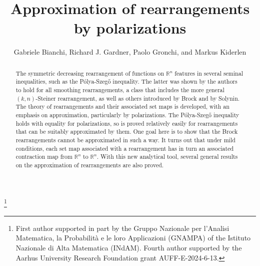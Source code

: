 \documentclass[12pt,reqno]{amsart}
\newcommand{\R}{{\mathbb R}}
\numberwithin{equation}{section}
\begin{document}
\bigskip

\title{Approximation of rearrangements by polarizations}
\author[Gabriele Bianchi, Richard J. Gardner, Paolo Gronchi, and Markus Kiderlen]{Gabriele Bianchi, Richard J. Gardner, Paolo Gronchi, and Markus Kiderlen}
\address{Dipartimento di Matematica e Informatica ``U. Dini", Universit\`a di Firenze, Viale Morgagni 67/A, Firenze, Italy I-50134} 
\address{Department of Mathematics, Western Washington University,
Bellingham, WA 98225-9063,USA} 
\address{Department of Mathematical Sciences, University of Aarhus,
Ny Munkegade, DK--8000 Aarhus C, Denmark} 
\thanks{First author supported in part by the Gruppo
Nazionale per l'Analisi Matematica, la Probabilit\`a e le loro
Applicazioni (GNAMPA) of the Istituto Nazionale di Alta Matematica (INdAM). Fourth author supported by the Aarhus University Research Foundation grant AUFF-E-2024-6-13.}
 


\begin{abstract}
The symmetric decreasing rearrangement of functions on $\R^n$ features in several seminal inequalities, such as the P\'olya-Szeg\H{o} inequality.  The latter was shown by the authors \cite{BGGK2} to hold for all smoothing rearrangements, a class that includes the more general $(k,n)$-Steiner rearrangement, as well as others introduced by Brock and by Solynin.  The theory of rearrangements and their associated set maps is developed, with an emphasis on approximation, particularly by polarizations. The P\'olya-Szeg\H{o} inequality holds with equality for polarizations, so is proved relatively easily for rearrangements that can be suitably approximated by them.  One goal here is to show that the Brock rearrangements cannot be approximated in such a way.  It turns out that under mild conditions, each set map associated with a rearrangement has in turn an associated contraction map from $\R^n$ to $\R^n$.  With this new analytical tool, several general results on the approximation of rearrangements are also proved.
\end{abstract}
\maketitle
\end{document}
